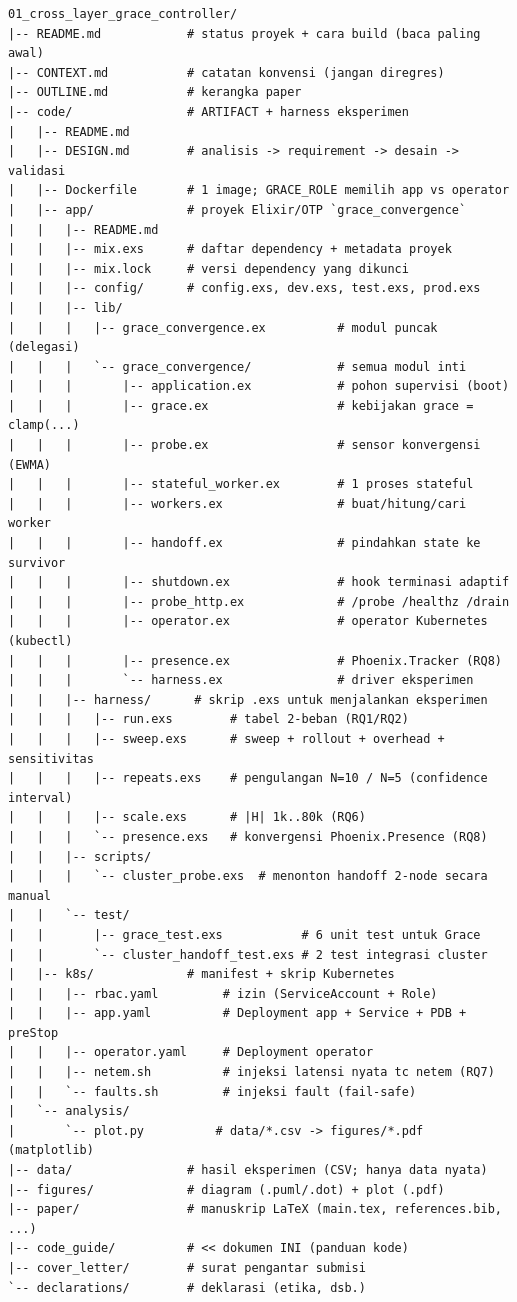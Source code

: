 \documentclass[11pt]{article}
\begin{document}
\begin{lstlisting}[basicstyle=\ttfamily\scriptsize]
01_cross_layer_grace_controller/
|-- README.md            # status proyek + cara build (baca paling awal)
|-- CONTEXT.md           # catatan konvensi (jangan diregres)
|-- OUTLINE.md           # kerangka paper
|-- code/                # ARTIFACT + harness eksperimen
|   |-- README.md
|   |-- DESIGN.md        # analisis -> requirement -> desain -> validasi
|   |-- Dockerfile       # 1 image; GRACE_ROLE memilih app vs operator
|   |-- app/             # proyek Elixir/OTP `grace_convergence`
|   |   |-- README.md
|   |   |-- mix.exs      # daftar dependency + metadata proyek
|   |   |-- mix.lock     # versi dependency yang dikunci
|   |   |-- config/      # config.exs, dev.exs, test.exs, prod.exs
|   |   |-- lib/
|   |   |   |-- grace_convergence.ex          # modul puncak (delegasi)
|   |   |   `-- grace_convergence/            # semua modul inti
|   |   |       |-- application.ex            # pohon supervisi (boot)
|   |   |       |-- grace.ex                  # kebijakan grace = clamp(...)
|   |   |       |-- probe.ex                  # sensor konvergensi (EWMA)
|   |   |       |-- stateful_worker.ex        # 1 proses stateful
|   |   |       |-- workers.ex                # buat/hitung/cari worker
|   |   |       |-- handoff.ex                # pindahkan state ke survivor
|   |   |       |-- shutdown.ex               # hook terminasi adaptif
|   |   |       |-- probe_http.ex             # /probe /healthz /drain
|   |   |       |-- operator.ex               # operator Kubernetes (kubectl)
|   |   |       |-- presence.ex               # Phoenix.Tracker (RQ8)
|   |   |       `-- harness.ex                # driver eksperimen
|   |   |-- harness/      # skrip .exs untuk menjalankan eksperimen
|   |   |   |-- run.exs        # tabel 2-beban (RQ1/RQ2)
|   |   |   |-- sweep.exs      # sweep + rollout + overhead + sensitivitas
|   |   |   |-- repeats.exs    # pengulangan N=10 / N=5 (confidence interval)
|   |   |   |-- scale.exs      # |H| 1k..80k (RQ6)
|   |   |   `-- presence.exs   # konvergensi Phoenix.Presence (RQ8)
|   |   |-- scripts/
|   |   |   `-- cluster_probe.exs  # menonton handoff 2-node secara manual
|   |   `-- test/
|   |       |-- grace_test.exs           # 6 unit test untuk Grace
|   |       `-- cluster_handoff_test.exs # 2 test integrasi cluster
|   |-- k8s/             # manifest + skrip Kubernetes
|   |   |-- rbac.yaml         # izin (ServiceAccount + Role)
|   |   |-- app.yaml          # Deployment app + Service + PDB + preStop
|   |   |-- operator.yaml     # Deployment operator
|   |   |-- netem.sh          # injeksi latensi nyata tc netem (RQ7)
|   |   `-- faults.sh         # injeksi fault (fail-safe)
|   `-- analysis/
|       `-- plot.py          # data/*.csv -> figures/*.pdf (matplotlib)
|-- data/                # hasil eksperimen (CSV; hanya data nyata)
|-- figures/             # diagram (.puml/.dot) + plot (.pdf)
|-- paper/               # manuskrip LaTeX (main.tex, references.bib, ...)
|-- code_guide/          # << dokumen INI (panduan kode)
|-- cover_letter/        # surat pengantar submisi
`-- declarations/        # deklarasi (etika, dsb.)
\end{lstlisting}
\end{document}
